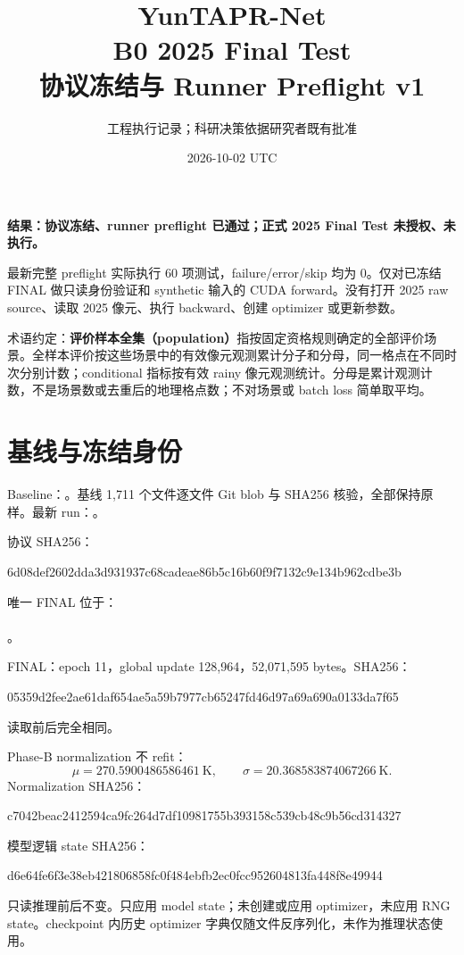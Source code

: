 \documentclass[UTF8,11pt,a4paper,fontset=windows]{ctexart}
\title{YunTAPR-Net\\B0 2025 Final Test\\协议冻结与 Runner Preflight v1}
\author{工程执行记录；科研决策依据研究者既有批准}
\date{2026-10-02 UTC}
\begin{document}
\maketitle
\textbf{结果：协议冻结、runner preflight 已通过；正式 2025 Final Test 未授权、未执行。}

最新完整 preflight 实际执行 60 项测试，failure/error/skip 均为 0。仅对已冻结 FINAL 做只读身份验证和 synthetic 输入的 CUDA forward。没有打开 2025 raw source、读取 2025 像元、执行 backward、创建 optimizer 或更新参数。

术语约定：\textbf{评价样本全集（population）}指按固定资格规则确定的全部评价场景。全样本评价按这些场景中的有效像元观测累计分子和分母，同一格点在不同时次分别计数；conditional 指标按有效 rainy 像元观测统计。分母是累计观测计数，不是场景数或去重后的地理格点数；不对场景或 batch loss 简单取平均。

\section{基线与冻结身份}
Baseline：。基线 1,711 个文件逐文件 Git blob 与 SHA256 核验，全部保持原样。最新 run：。

协议 SHA256：\par{\small\ttfamily 6d08def2602dda3d931937c68cadeae86b5c16b60f9f7132c9e134b962cdbe3b}\par

唯一 FINAL 位于：\\
\\
。

FINAL：epoch 11，global update 128,964，52,071,595 bytes。SHA256：
\par{\small\ttfamily 05359d2fee2ae61daf654ae5a59b7977cb65247fd46d97a69a690a0133da7f65}\par
读取前后完全相同。

Phase-B normalization 不 refit：
\[
\mu=270.5900486586461\ \mathrm{K},\qquad
\sigma=20.368583874067266\ \mathrm{K}.
\]
Normalization SHA256：
\par{\small\ttfamily c7042beac2412594ca9fc264d7df10981755b393158c539cb48c9b56cd314327}\par

模型逻辑 state SHA256：
\par{\small\ttfamily d6e64fe6f3e38eb421806858fc0f484ebfb2ec0fcc952604813fa448f8e49944}\par
只读推理前后不变。只应用 model state；未创建或应用 optimizer，未应用 RNG state。checkpoint 内历史 optimizer 字典仅随文件反序列化，未作为推理状态使用。
\end{document}
